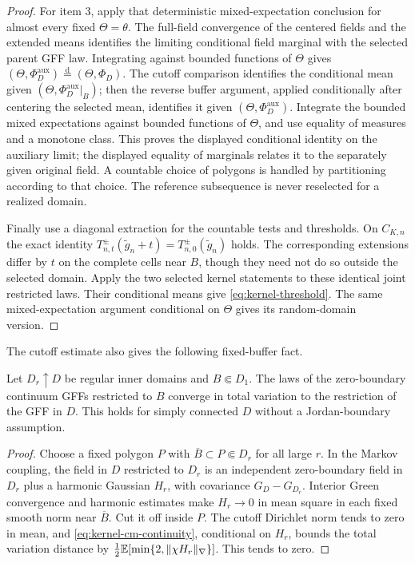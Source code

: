 \begin{proof}
For item 3, apply that deterministic mixed-expectation conclusion
for almost every fixed \(\Theta=\theta\). The full-field convergence
of the centered fields and the extended means identifies the limiting
conditional field marginal with the selected parent GFF law. Integrating
against bounded functions of \(\Theta\) gives
\((\Theta,\Phi_D^{\mathrm{aux}})\stackrel{\mathrm d}=
(\Theta,\Phi_D)\). The cutoff comparison identifies the conditional
mean given \((\Theta,\Phi_D^{\mathrm{aux}}|_B)\); then the reverse buffer
argument, applied conditionally after centering the selected mean,
identifies it given \((\Theta,\Phi_D^{\mathrm{aux}})\).
Integrate the bounded mixed expectations against bounded functions
of \(\Theta\), and use equality of measures and a monotone class.
This proves the displayed conditional identity on the auxiliary limit;
the displayed equality of marginals relates it to the separately given
original field. A countable choice of polygons is handled by partitioning
according to that choice.
The reference subsequence is never reselected for a realized domain.

Finally use a diagonal extraction for the countable tests and
thresholds. On \(C_{K,n}\) the exact identity
\(T_{n,t}^{\pm}(\widetilde g_n+t)=T_{n,0}^{\pm}(\widetilde g_n)\)
holds. The corresponding extensions differ by \(t\) on the complete
cells near \(B\), though they need not do so outside the selected
domain. Apply the two selected kernel statements to these identical
joint restricted laws. Their conditional means give
\eqref{eq:kernel-threshold}. The same mixed-expectation argument
conditional on \(\Theta\) gives its random-domain version.
\end{proof}

The cutoff estimate also gives the following fixed-buffer fact.

\begin{lemma}
\label{lem:kernel-exhaustion}
Let \(D_r\uparrow D\) be regular inner domains and \(B\Subset D_1\).
The laws of the zero-boundary continuum GFFs restricted to \(B\)
converge in total variation to the restriction of the GFF in \(D\).
This holds for simply connected \(D\) without a Jordan-boundary
assumption.
\end{lemma}

\begin{proof}
Choose a fixed polygon \(P\) with \(\overline B\subset P\Subset D_r\)
for all large \(r\). In the Markov coupling, the field in \(D\)
restricted to \(D_r\) is an independent zero-boundary field in \(D_r\)
plus a harmonic Gaussian \(H_r\), with covariance \(G_D-G_{D_r}\).
Interior Green convergence and harmonic estimates make \(H_r\to0\)
in mean square in each fixed smooth norm near \(\overline B\).
Cut it off inside \(P\). The cutoff Dirichlet norm tends to zero
in mean, and \eqref{eq:kernel-cm-continuity}, conditional on \(H_r\),
bounds the total variation distance by
\(\tfrac12\mathbb E[\min\{2,\|\chi H_r\|_\nabla\}]\). This tends to zero.
\end{proof}

